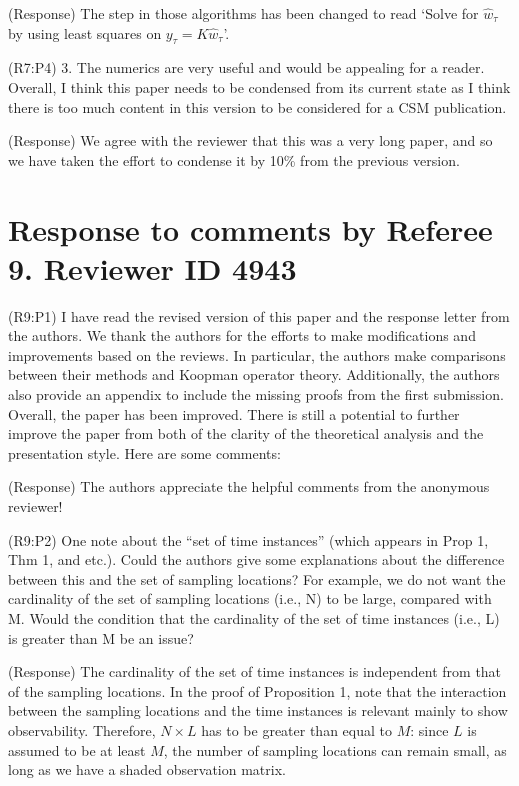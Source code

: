 \documentclass{letter}
\begin{document}
{\color{red}(Response)} The step in those algorithms has been changed to read `Solve for $\hat{w}_{\tau}$ by using least squares on $y_{\tau} = K\hat{w}_{\tau}$'.

{\color{red}(R7:P4)} 3. The numerics are very useful and would be appealing for a reader. Overall, I think this paper needs to be condensed from its current state as I think there is too much content in this version to be considered for a CSM publication.

{\color{red}(Response)} We agree with the reviewer that this was a very long paper, and so we have taken the effort to condense it by 10\% from the previous version.



\section{Response to comments by Referee 9. Reviewer ID 4943}

{\color{red}(R9:P1)} I have read the revised version of this paper and the response letter from the authors. We thank the authors for the efforts to make modifications and improvements based on the reviews. In particular, the authors make comparisons between their methods and Koopman operator theory. Additionally, the authors also provide an appendix to include the missing proofs from the first submission. Overall, the paper has been improved. There is still a potential to further improve the paper from both of the clarity of the theoretical analysis and the presentation style. Here are some comments:  

{\color{red}(Response)} The authors appreciate the helpful comments from the anonymous reviewer!

{\color{red}(R9:P2)} One note about the “set of time instances” (which appears in Prop 1, Thm 1, and etc.). Could the authors give some explanations about the difference between this and the set of sampling locations? For example, we do not want the cardinality of the set of sampling locations (i.e., N) to be large, compared with M. Would the condition that the cardinality of the set of time instances (i.e., L) is greater than M be an issue?

{\color{red}(Response)} The cardinality of the set of time instances is independent from that of the sampling locations. In the proof of Proposition 1, note that the interaction between the sampling locations and the time instances is relevant mainly to show observability. Therefore, $N\times L$ has to be greater than equal to $M$: since $L$ is assumed to be at least $M$, the number of sampling locations can remain small, as long as we have a shaded observation matrix. 
\end{document}
